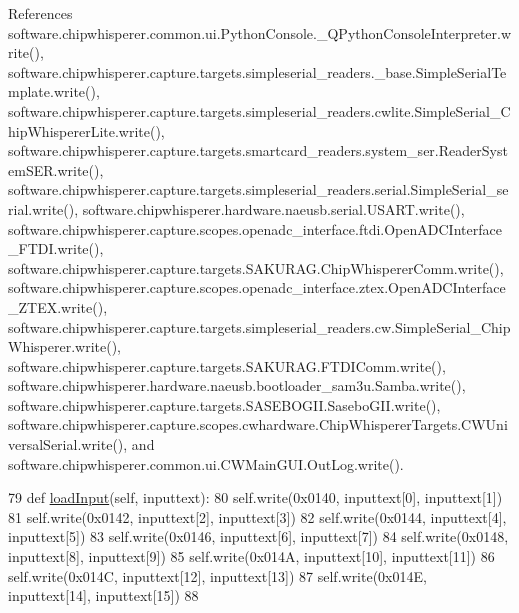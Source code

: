 References software.\+chipwhisperer.\+common.\+ui.\+Python\+Console.\+\_\+\+Q\+Python\+Console\+Interpreter.\+write(), software.\+chipwhisperer.\+capture.\+targets.\+simpleserial\+\_\+readers.\+\_\+base.\+Simple\+Serial\+Template.\+write(), software.\+chipwhisperer.\+capture.\+targets.\+simpleserial\+\_\+readers.\+cwlite.\+Simple\+Serial\+\_\+\+Chip\+Whisperer\+Lite.\+write(), software.\+chipwhisperer.\+capture.\+targets.\+smartcard\+\_\+readers.\+system\+\_\+ser.\+Reader\+System\+S\+E\+R.\+write(), software.\+chipwhisperer.\+capture.\+targets.\+simpleserial\+\_\+readers.\+serial.\+Simple\+Serial\+\_\+serial.\+write(), software.\+chipwhisperer.\+hardware.\+naeusb.\+serial.\+U\+S\+A\+R\+T.\+write(), software.\+chipwhisperer.\+capture.\+scopes.\+openadc\+\_\+interface.\+ftdi.\+Open\+A\+D\+C\+Interface\+\_\+\+F\+T\+D\+I.\+write(), software.\+chipwhisperer.\+capture.\+targets.\+S\+A\+K\+U\+R\+A\+G.\+Chip\+Whisperer\+Comm.\+write(), software.\+chipwhisperer.\+capture.\+scopes.\+openadc\+\_\+interface.\+ztex.\+Open\+A\+D\+C\+Interface\+\_\+\+Z\+T\+E\+X.\+write(), software.\+chipwhisperer.\+capture.\+targets.\+simpleserial\+\_\+readers.\+cw.\+Simple\+Serial\+\_\+\+Chip\+Whisperer.\+write(), software.\+chipwhisperer.\+capture.\+targets.\+S\+A\+K\+U\+R\+A\+G.\+F\+T\+D\+I\+Comm.\+write(), software.\+chipwhisperer.\+hardware.\+naeusb.\+bootloader\+\_\+sam3u.\+Samba.\+write(), software.\+chipwhisperer.\+capture.\+targets.\+S\+A\+S\+E\+B\+O\+G\+I\+I.\+Sasebo\+G\+I\+I.\+write(), software.\+chipwhisperer.\+capture.\+scopes.\+cwhardware.\+Chip\+Whisperer\+Targets.\+C\+W\+Universal\+Serial.\+write(), and software.\+chipwhisperer.\+common.\+ui.\+C\+W\+Main\+G\+U\+I.\+Out\+Log.\+write().


\begin{DoxyCode}
79     \textcolor{keyword}{def }\hyperlink{classsoftware_1_1chipwhisperer_1_1capture_1_1targets_1_1SASEBOGII_1_1SaseboGIIDPAContest_a8be8a8692d23ebb986d96a933b8de79f}{loadInput}(self, inputtext):
80         self.write(0x0140, inputtext[0], inputtext[1])
81         self.write(0x0142, inputtext[2], inputtext[3])
82         self.write(0x0144, inputtext[4], inputtext[5])
83         self.write(0x0146, inputtext[6], inputtext[7])
84         self.write(0x0148, inputtext[8], inputtext[9])
85         self.write(0x014A, inputtext[10], inputtext[11])
86         self.write(0x014C, inputtext[12], inputtext[13])
87         self.write(0x014E, inputtext[14], inputtext[15])
88 
\end{DoxyCode}
\hypertarget{classsoftware_1_1chipwhisperer_1_1capture_1_1targets_1_1SASEBOGII_1_1SaseboGIIDPAContest_aa8b606c65fbf9e89dc4831ef972613f0}{}
